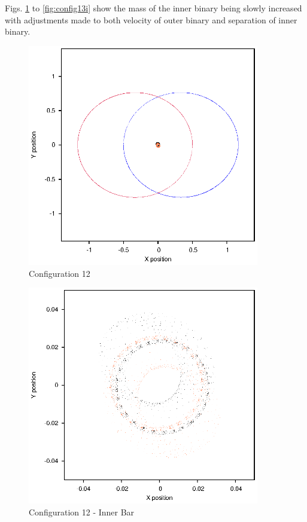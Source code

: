 \documentclass[a4paper,12pt]{article}
\begin{document}
Figs. \ref{fig:config12} to \ref{fig:config13i} show the mass of the inner binary being slowly increased with adjustments made to both velocity of outer binary
and separation of inner binary.
\begin{figure}[H]
\centering
\includegraphics[width=0.9\textwidth]{./2017results/025-7-025-5/Orbit.eps}
\caption{Configuration 12}
\label{fig:config12}
\end{figure}
\begin{figure}[H]
\centering
\includegraphics[width=0.9\textwidth]{./2017results/025-7-025-5/Inner.eps}
\caption{Configuration 12 - Inner Bar}
\label{fig:config12i}
\end{figure}
\end{document}

